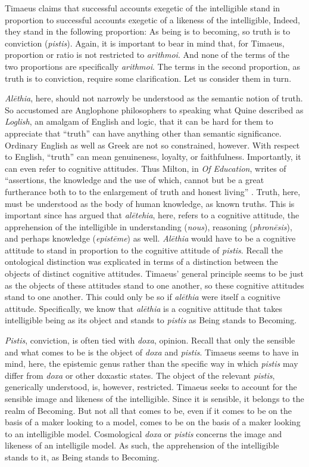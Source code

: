 Timaeus claims that successful accounts exegetic of the intelligible stand in proportion to successful accounts exegetic of a likeness of the intelligible, Indeed, they stand in the following proportion: As being is to becoming, so truth is to conviction (\emph{pistis}). Again, it is important to bear in mind that, for Timaeus, proportion or ratio is not restricted to \emph{arithmoi}. And none of the terms of the two proportions are specifically \emph{arithmoi}. The terms in the second proportion, as truth is to conviction, require some clarification. Let us consider them in turn.

\emph{Alēthia}, here, should not narrowly be understood as the semantic notion of truth. So accustomed are Anglophone philosophers to speaking what Quine described as \emph{Loglish}, an amalgam of English and logic, that it can be hard for them to appreciate that ``truth'' can have anything other than semantic significance. Ordinary English as well as Greek are not so constrained, however. With respect to English, ``truth'' can mean genuineness, loyalty, or faithfulness. Importantly, it can even refer to cognitive attitudes. Thus Milton, in \emph{Of Education}, writes of ``assertions, the knowledge and the use of which, cannot but be a great furtherance both to to the enlargement of truth and honest living'' \citep[51]{Ainsworth:1928cy}. Truth, here, must be understood as the body of human knowledge, as known truths. This is important since \citet[]{Burnyeat:2005it} has argued that \emph{alētehia}, here, refers to a cognitive attitude, the apprehension of the intelligible in understanding (\emph{nous}), reasoning (\emph{phronēsis}), and perhaps knowledge (\emph{epistēme}) as well. \emph{Alēthia} would have to be a cognitive attitude to stand in proportion to the cognitive attitude of \emph{pistis}. Recall the ontological distinction was explicated in terms of a distinction between the objects of distinct cognitive attitudes. Timaeus' general principle seems to be just as the objects of these attitudes stand to one another, so these cognitive attitudes stand to one another. This could only be so if \emph{alēthia} were itself a cognitive attitude. Specifically, we know that \emph{alēthia} is a cognitive attitude that takes intelligible being as its object and stands to \emph{pistis} as Being stands to Becoming.

\emph{Pistis}, conviction, is often tied with \emph{doxa}, opinion. Recall that only the sensible and what comes to be is the object of \emph{doxa} and \emph{pistis}. Timaeus seems to have in mind, here, the epistemic genus rather than the specific way in which \emph{pistis} may differ from \emph{doxa} or other doxastic states. The object of the relevant \emph{pistis}, generically understood, is, however, restricted. Timaeus seeks to account for the sensible image and likeness of the intelligible. Since it is sensible, it belongs to the realm of Becoming. But not all that comes to be, even if it comes to be on the basis of a maker looking to a model, comes to be on the basis of a maker looking to an intelligible model. Cosmological \emph{doxa} or \emph{pistis} concerns the image and likeness of an intelligile model. As such, the apprehension of the intelligible stands to it, as Being stands to Becoming.

